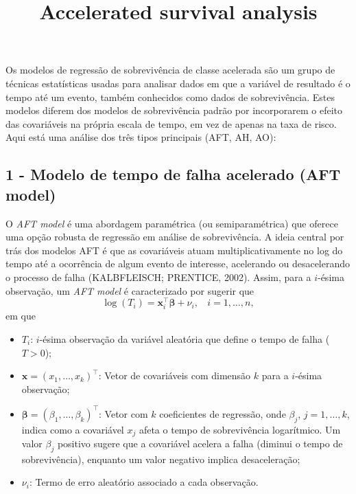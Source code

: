\documentclass[
]{article}
\title{Accelerated survival analysis}
\author{}
\date{\vspace{-2.5em}}
\providecommand{\tightlist}{%
  \setlength{\itemsep}{0pt}\setlength{\parskip}{0pt}}
\begin{document}
\maketitle

Os modelos de regressão de sobrevivência de classe acelerada são um
grupo de técnicas estatísticas usadas para analisar dados em que a
variável de resultado é o tempo até um evento, também conhecidos como
dados de sobrevivência. Estes modelos diferem dos modelos de
sobrevivência padrão por incorporarem o efeito das covariáveis na
própria escala de tempo, em vez de apenas na taxa de risco. Aqui está
uma análise dos três tipos principais (AFT, AH, AO):

\hypertarget{modelo-de-tempo-de-falha-acelerado-aft-model}{%
\subsection{1 - Modelo de tempo de falha acelerado (AFT
model)}\label{modelo-de-tempo-de-falha-acelerado-aft-model}}

O \emph{AFT model} é uma abordagem paramétrica (ou semiparamétrica) que
oferece uma opção robusta de regressão em análise de sobrevivência. A
ideia central por trás dos modelos AFT é que as covariáveis atuam
multiplicativamente no log do tempo até a ocorrência de algum evento de
interesse, acelerando ou desacelerando o processo de falha (KALBFLEISCH;
PRENTICE, 2002). Assim, para a \(i\)-ésima observação, um \emph{AFT
model} é caracterizado por sugerir que \[
\log(T_i) = \mathbf{x}_i^{\top}\pmb{\beta} + \nu_i, \ \ \ \ i=1, \dots, n,
\] em que

\begin{itemize}
\tightlist
\item
  \(T_i\): \(i\)-ésima observação da variável aleatória que define o
  tempo de falha (\(T>0\));
\item
  \(\mathbf{x}=(x_1, \dots, x_k)^{\top}\): Vetor de covariáveis com
  dimensão \(k\) para a \(i\)-ésima observação;
\item
  \(\pmb{\beta}=(\beta_1, \dots, \beta_k)^{\top}\): Vetor com \(k\)
  coeficientes de regressão, onde \(\beta_j\), \(j=1, \dots, k\), indica
  como a covariável \(x_j\) afeta o tempo de sobrevivência logarítmico.
  Um valor \(\beta_j\) positivo sugere que a covariável acelera a falha
  (diminui o tempo de sobrevivência), enquanto um valor negativo implica
  desaceleração;
\item
  \(\nu_i\): Termo de erro aleatório associado a cada observação.
\end{itemize}
\end{document}
